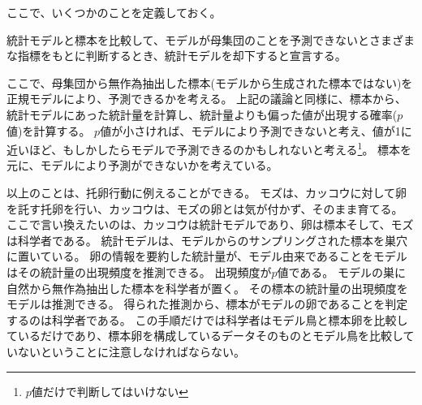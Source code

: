 ここで、いくつかのことを定義しておく。
\begin{defi}
    統計モデルと標本を比較して、モデルが母集団のことを予測できないとさまざまな指標をもとに判断するとき、統計モデルを却下すると宣言する。
\end{defi}

ここで、母集団から無作為抽出した標本(モデルから生成された標本ではない)を正規モデルにより、予測できるかを考える。
上記の議論と同様に、標本から、統計モデルにあった統計量を計算し、統計量よりも偏った値が出現する確率($p$値)を計算する。
$p$値が小さければ、モデルにより予測できないと考え、値が1に近いほど、もしかしたらモデルで予測できるのかもしれないと考える\footnote{$p$値だけで判断してはいけない}。
標本を元に、モデルにより予測ができないかを考えている。



以上のことは、托卵行動に例えることができる。
モズは、カッコウに対して卵を託す托卵を行い、カッコウは、モズの卵とは気が付かず、そのまま育てる。
ここで言い換えたいのは、カッコウは統計モデルであり、卵は標本そして、モズは科学者である。
統計モデルは、モデルからのサンプリングされた標本を巣穴に置いている。
卵の情報を要約した統計量が、モデル由来であることをモデルはその統計量の出現頻度を推測できる。
出現頻度が$p$値である。
モデルの巣に自然から無作為抽出した標本を科学者が置く。
その標本の統計量の出現頻度をモデルは推測できる。
得られた推測から、標本がモデルの卵であることを判定するのは科学者である。
この手順だけでは科学者はモデル鳥と標本卵を比較しているだけであり、標本卵を構成しているデータそのものとモデル鳥を比較していないということに注意しなければならない。


